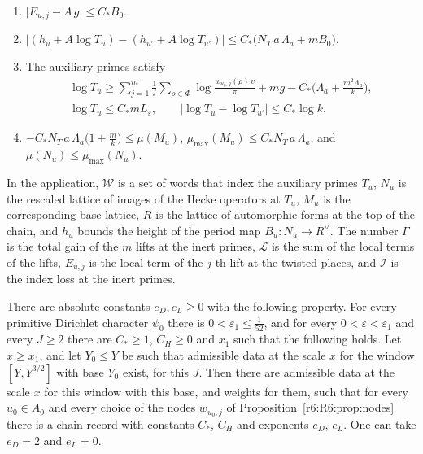 \begin{definition}
\begin{enumerate}
\begin{multline*}
\end{multline*}
\item[(K5)] $\lvert E_{u,j}-A\,g\rvert\le C_\ast B_0$.
\item[(K6)] $\big\lvert(h_u+A\log T_u)-(h_{u'}+A\log T_{u'})\big\rvert\le C_\ast\big(N_T\,a\,\Lambda_a+mB_0\big)$.
\item[(K7)] The auxiliary primes satisfy
\begin{gather*}
\log T_u\ge\sum_{j=1}^m\frac1f\sum_{\rho\in\Phi}\log\frac{w_{u_0,j}(\rho)\,v}{\pi}+mg-C_\ast\Big(\Lambda_a+\frac{m^2\Lambda_a}k\Big),\\
\log T_u\le C_\ast m L_\varepsilon,\qquad\lvert\log T_u-\log T_{u'}\rvert\le C_\ast\log k .
\end{gather*}
\item[(K8)] $-C_\ast N_T\,a\,\Lambda_a\big(1+\frac mk\big)\le\mu(M_u)$, $\mu_{\max}(M_u)\le C_\ast N_T\,a\,\Lambda_a$, and $\mu(N_u)\le\mu_{\max}(N_u)$.
\end{enumerate}
\end{definition}

In the application, $\mathcal W$ is a set of words that index the auxiliary primes $T_u$, $N_u$ is the rescaled lattice of images of the Hecke operators at $T_u$, $M_u$ is the corresponding base lattice, $R$ is the lattice of automorphic forms at the top of the chain, and $h_u$ bounds the height of the period map $B_u\colon N_u\to R^\vee$. The number $\Gamma$ is the total gain of the $m$ lifts at the inert primes, $\mathcal L$ is the sum of the local terms of the lifts, $E_{u,j}$ is the local term of the $j$-th lift at the twisted places, and $\mathcal I$ is the index loss at the inert primes.

\begin{hypothesis}\label{r6:R6:thm:records}
There are absolute constants $e_D,e_L\ge0$ with the following property. For every primitive Dirichlet character $\psi_0$ there is $0<\varepsilon_1\le\frac1{52}$, and for every $0<\varepsilon<\varepsilon_1$ and every $J\ge2$ there are $C_\ast\ge1$, $C_H\ge0$ and $x_1$ such that the following holds. Let $x\ge x_1$, and let $Y_0\le Y$ be such that admissible data at the scale $x$ for the window $[Y,Y^{3/2}]$ with base $Y_0$ exist, for this $J$. Then there are admissible data at the scale $x$ for this window with this base, and weights for them, such that for every $u_0\in A_0$ and every choice of the nodes $w_{u_0,j}$ of Proposition~\ref{r6:R6:prop:nodes} there is a chain record with constants $C_\ast$, $C_H$ and exponents $e_D$, $e_L$. One can take $e_D=2$ and $e_L=0$.
\end{hypothesis}

